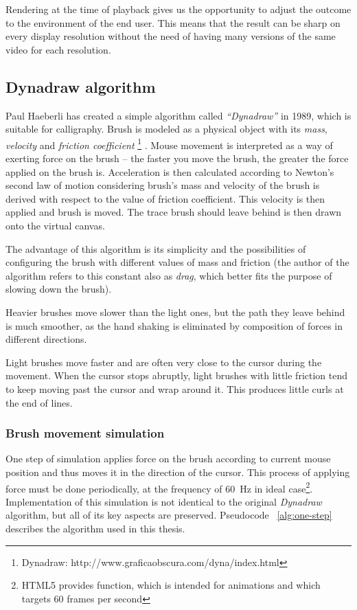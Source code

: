 Rendering at the time of playback gives us the opportunity to adjust the outcome to the environment of the end user. This means that the result can be sharp on every display resolution without the need of having many versions of the same video for each resolution.

\subsection{Dynadraw algorithm}
\label{sec:dynadraw}

Paul Haeberli has created a simple algorithm called \textit{``Dynadraw''} in 1989, which is suitable for calligraphy. Brush is modeled as a physical object with its \textit{mass}, \textit{velocity} and \textit{friction coefficient} \footnote{Dynadraw: http://www.graficaobscura.com/dyna/index.html} \cite{}. Mouse movement is interpreted as a way of exerting force on the brush -- the faster you move the brush, the greater the force applied on the brush is. Acceleration is then calculated according to Newton's second law of motion considering brush's mass and velocity of the brush is derived with respect to the value of friction coefficient. This velocity is then applied and brush is moved. The trace brush should leave behind is then drawn onto the virtual canvas.

The advantage of this algorithm is its simplicity and the possibilities of configuring the brush with different values of mass and friction (the author of the algorithm refers to this constant also as \textit{drag}, which better fits the purpose of slowing down the brush).

Heavier brushes move slower than the light ones, but the path they leave behind is much smoother, as the hand shaking is eliminated by composition of forces in different directions.

Light brushes move faster and are often very close to the cursor during the movement. When the cursor stops abruptly, light brushes with little friction tend to keep moving past the cursor and wrap around it. This produces little curls at the end of lines.

\subsubsection*{Brush movement simulation}

One step of simulation applies force on the brush according to current mouse position and thus moves it in the direction of the cursor. This process of applying force must be done periodically, at the frequency of 60~Hz in ideal case\footnote{HTML5 provides  function, which is intended for animations and which targets 60 frames per second}. Implementation of this simulation is not identical to the original \textit{Dynadraw} algorithm, but all of its key aspects are preserved. Pseudocode ~\ref{alg:one-step} describes the algorithm used in this thesis.

